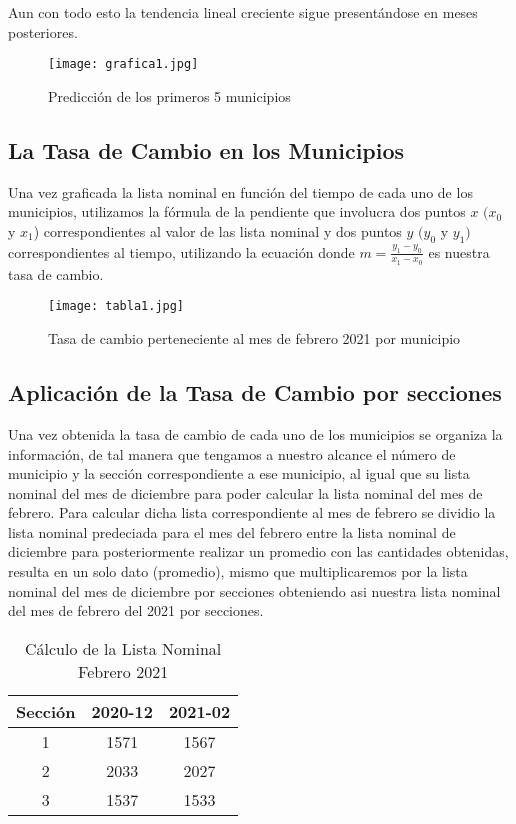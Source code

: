 \documentclass[12pt,a4paper]{report}
\begin{document}
Aun con todo esto la tendencia lineal creciente sigue presentándose en meses posteriores.

\begin{figure}[h!]
\centering
\texttt{[image: grafica1.jpg]}
\caption{Predicción de los primeros 5 municipios}
\end{figure}

\subsection*{La Tasa de Cambio en los Municipios}
Una vez graficada la lista nominal en función del tiempo de cada uno de los municipios, utilizamos la fórmula de la pendiente que involucra dos puntos $x$ $(x_0$ y $x_1$) correspondientes al valor de las lista nominal y dos puntos $y$ $(y_0$ y $y_1)$ correspondientes al tiempo, utilizando la ecuación donde $m= \frac{y_{1}-y_{0}}{x_{1}-x_{0}}$ es nuestra tasa de cambio.

\newpage

\begin{figure}[h!]
\texttt{[image: tabla1.jpg]}
\caption{Tasa de cambio perteneciente al mes de febrero 2021 por municipio}
\end{figure}


\subsection*{Aplicación de la Tasa de Cambio por secciones}

Una vez obtenida la tasa de cambio de cada uno de los municipios se organiza la información, de tal manera que tengamos a nuestro alcance el número de municipio y la sección correspondiente a ese municipio, al igual que su lista nominal del mes de diciembre para poder calcular la lista nominal del mes de febrero. Para calcular dicha lista correspondiente al mes de febrero se dividio la lista nominal predeciada para el mes del febrero entre la lista nominal de diciembre para posteriormente realizar un promedio con las cantidades  obtenidas, resulta en un solo dato (promedio), mismo que multiplicaremos por la lista nominal del mes de diciembre por secciones obteniendo asi nuestra lista nominal del mes de febrero del 2021 por secciones.  

\begin{table}[h!]
\caption{Cálculo de la Lista Nominal Febrero 2021}
\vspace{0.25cm}
\centering
\begin{tabular}{|c|c|c|}
\hline
\textbf{Sección}&\textbf{2020-12}&\textbf{2021-02}
\\\hline
1&1571&1567\\\hline
2&2033&2027\\\hline
3&1537&1533\\\hline
\end{tabular}
\end{table}
\end{document}
